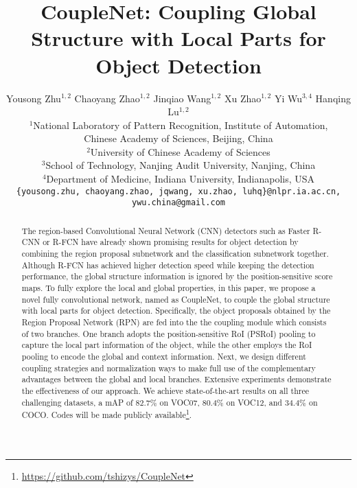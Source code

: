 \documentclass[10pt,twocolumn,letterpaper]{article}
\begin{document}
\title{CoupleNet: Coupling Global Structure with Local Parts for Object Detection}

\author{Yousong Zhu{$^{1,2}$} \quad Chaoyang Zhao{$^{1,2}$} \quad Jinqiao Wang{$^{1,2}$} \quad Xu Zhao{$^{1,2}$} \quad Yi Wu{$^{3,4}$} \quad Hanqing Lu{$^{1,2}$}\\
{$^1$}National Laboratory of Pattern Recognition, Institute of Automation, \\Chinese Academy of Sciences, Beijing, China\\
{$^2$}University of Chinese Academy of Sciences\\
{$^3$}School of Technology, Nanjing Audit University, Nanjing, China\\
{$^4$}Department of Medicine, Indiana University, Indianapolis, USA\\
{\tt\small \{yousong.zhu, chaoyang.zhao, jqwang, xu.zhao, luhq\}@nlpr.ia.ac.cn, ywu.china@gmail.com}
}




\maketitle



\begin{abstract}

  The region-based Convolutional Neural Network (CNN) detectors such as Faster R-CNN or R-FCN have already shown promising results for object detection by combining the region proposal subnetwork and the classification subnetwork together. Although R-FCN has achieved higher detection speed while keeping the detection performance, the global structure information is ignored by the position-sensitive score maps. To fully explore the local and global properties, in this paper, we propose a novel fully convolutional network, named as CoupleNet, to couple the global structure with local parts for object detection. Specifically, the object proposals obtained by the Region Proposal Network (RPN) are fed into the the coupling module which consists of two branches. One branch adopts the position-sensitive RoI (PSRoI) pooling to capture the local part information of the object, while the other employs the RoI pooling to encode the global and context information. Next, we design different coupling strategies and normalization ways to make full use of the complementary advantages between the global and local branches. Extensive experiments demonstrate the effectiveness of our approach. We achieve state-of-the-art results on all three challenging datasets, \ie a mAP of $82.7\%$ on VOC07, $80.4\%$ on VOC12, and $34.4\%$ on COCO.
  Codes will be made publicly available\footnote {\url{https://github.com/tshizys/CoupleNet}}.
\end{abstract}
\end{document}
